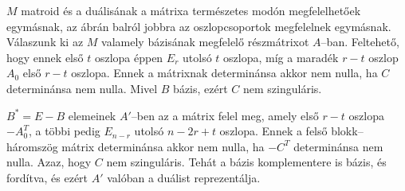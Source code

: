 $M$ matroid és a duálisának a mátrixa természetes modón megfelelhetőek
egymásnak, az ábrán balról jobbra az oszlopcsoportok megfelelnek egymásnak.
Válaszunk ki az $M$ valamely bázisának megfelelő részmátrixot $A$--ban.
Feltehető, hogy ennek első $t$ oszlopa éppen $E_r$ utolsó $t$ oszlopa, míg a
maradék $r-t$ oszlop $A_0$ első $r-t$ oszlopa. Ennek a mátrixnak determinánsa
akkor nem nulla, ha $C$ determinánsa nem nulla. Mivel $B$ bázis, ezért $C$ nem
szinguláris.

$B^*=E-B$ elemeinek $A'$--ben az a mátrix felel meg, amely első $r-t$ oszlopa
$-A_0^T$, a többi pedig $E_{n-r}$ utolsó $n-2r+t$ oszlopa. Ennek a felső
blokk--háromszög mátrix determinánsa akkor nem nulla, ha $-C^T$ determinánsa nem
nulla.  Azaz, hogy $C$ nem szinguláris. Tehát a bázis komplementere is bázis, és
fordítva, és ezért $A'$ valóban a duálist reprezentálja.
